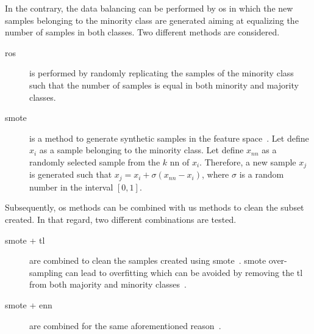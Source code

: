 In the contrary, the data balancing can be performed by \ac{os} in which the new samples belonging to the minority class are generated aiming at equalizing the number of samples in both classes.
Two different methods are considered.

\begin{description}
  \item[\Ac{ros}] is performed by randomly replicating the samples of the minority class such that the number of samples is equal in both minority and majority classes.
  \item[\Ac{smote}] is a method to generate synthetic samples in the feature space~\cite{chawla2002smote}.
Let define $x_i$ as a sample belonging to the minority class.
Let define $x_{nn}$ as a randomly selected sample from the $k$ \ac{nn} of $x_i$.
Therefore, a new sample $x_j$ is generated such that $x_j = x_i + \sigma \left( x_{nn} - x_i \right)$, where $\sigma$ is a random number in the interval $\left[0,1\right]$.
\end{description}

Subsequently, \ac{os} methods can be combined with \ac{us} methods to clean the subset created.
In that regard, two different combinations are tested.

\begin{description}
  \item[\ac{smote} + \ac{tl}] are combined to clean the samples created using \ac{smote}~\cite{batista2003balancing}.
\ac{smote} over-sampling can lead to overfitting which can be avoided by removing the \ac{tl} from both majority and minority classes~\cite{prati2009data}.
  \item[\ac{smote} + \ac{enn}] are combined for the same aforementioned reason~\cite{batista2004study}.
\end{description}


